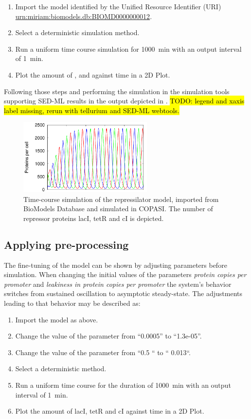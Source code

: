 \begin{enumerate}
 	\item{Import the model identified by the Unified Resource Identifier (URI) \citep{Berners-Lee:2005}\\ 	\url{urn:miriam:biomodels.db:BIOMD0000000012}.}
 	\item {Select a deterministic simulation method.}
 	\item{Run a uniform time course simulation for 1000~min with an output interval of 1~min.}
 	\item{Plot the amount of ,  and  against time in a 2D Plot.}
 \end{enumerate}

Following those steps and performing the simulation in the simulation tools supporting SED-ML results in the output depicted in . \hl{TODO: legend and xaxis label missing, rerun with tellurium and SED-ML webtools.}

\begin{figure}[H]
\centering
\includegraphics[width=0.6\textwidth]{examples/rep_tc.png}
\caption{Time-course simulation of the repressilator model, imported from BioModels Database and simulated in COPASI. The number of repressor proteins lacI, tetR and cI is depicted.}
\label{fig:rep_tc}
\end{figure}


\subsection{Applying pre-processing}
\label{sec:preprocessing}
The fine-tuning of the model can be shown by adjusting parameters before simulation. When changing the initial values of the parameters \emph{protein copies per promoter} and \emph{leakiness in protein copies per promoter} the system's behavior switches from sustained oscillation to asymptotic steady-state. The adjustments leading to that behavior may be described as: 

\begin{enumerate}
\item{Import the model as above.}
\item{Change the value of the parameter  from “0.0005” to “1.3e-05”.}
\item{Change the value of the parameter  from “0.5 “ to “ 0.013“.}
\item{Select a deterministic method.}
\item{Run a uniform time course for the duration of 1000~min with an output interval of 1~min.}
\item Plot the amount of lacI, tetR and cI against time in a 2D Plot.
\end{enumerate}

